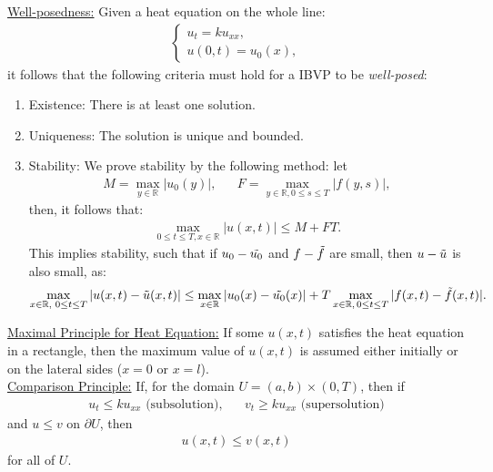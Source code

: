 \documentclass{article}
\newcommand{\sheader}[1]{\underline{#1:}}
\newcommand{\gap}{\medskip\\}
\begin{document}
\sheader{Well-posedness} Given a heat equation on the whole line:
\begin{align*}
    \begin{cases}
        u_t = ku_{xx},\\
        u(0, t) = u_0(x),
    \end{cases}
\end{align*}
it follows that the following criteria must hold for a IBVP to be \textit{well-posed}:
\begin{enumerate}
    \item Existence: There is at least one solution.
    \item Uniqueness: The solution is unique and bounded.
    \item Stability: We prove stability by the following method: let
    \begin{align*}
        M = \max_{y \in \mathbb{R}} |u_0(y)|, && F = \max_{y \in \mathbb{R}, 0 \leq s \leq T} |f(y, s)|,
    \end{align*}
    then, it follows that:
    \begin{align*}
        \max_{0 \leq t \leq T, x \in \mathbb{R}}|u(x, t)| \leq M + FT.
    \end{align*}
    This implies stability, such that if $u_0 - \Tilde{u_0}$ and $f - \Tilde{f}$ are small, then $u-\Tilde{u}$ is also small, as:
    \begin{align*}
        \max_{x \in \mathbb{R}, \,\, 0 \leq t \leq T} |u(x, t) - \Tilde u(x, t) | \leq \max_{x \in \mathbb{R}} |u_0(x) - \Tilde{u_0}(x)| 
        + T \max_{x\in \mathbb{R}, \, 0 \leq t \leq T}|f(x, t) - \Tilde{f}(x, t) |.
    \end{align*}
\end{enumerate}

\sheader{Maximal Principle for Heat Equation} If some $u(x,t)$ satisfies the heat 
equation in a rectangle, then the maximum value of $u(x, t)$ is assumed either 
initially or on the lateral sides ($x=0$ or $x=l$).
\gap
\sheader{Comparison Principle} If, for the domain $U = (a, b) \times (0, T)$,
then if 
\begin{align*}
   u_t \leq ku_{xx} \textrm{ (subsolution)}, && v_t \geq ku_{xx} \textrm{ (supersolution)}
\end{align*}
and $u \leq v$ on $\partial U$, then
\begin{align*}
    u(x,t) \leq v(x, t)
\end{align*}
for all of $U$.
\end{document}
